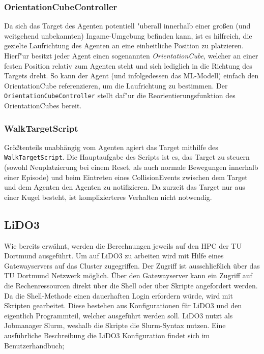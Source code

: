\subsubsection{OrientationCubeController}

Da sich das Target des Agenten potentiell "uberall innerhalb einer großen (und weitgehend unbekannten) Ingame-Umgebung befinden kann, ist es hilfreich, die gezielte Laufrichtung des Agenten an eine einheitliche Position zu platzieren. Hierf"ur besitzt jeder Agent einen sogenannten \textit{OrientationCube}, welcher an einer festen Position relativ zum Agenten steht und sich lediglich in die Richtung des Targets dreht. So kann der Agent (und infolgedessen das ML-Modell) einfach den OrientationCube referenzieren, um die Laufrichtung zu bestimmen. Der \texttt{OrientationCubeController} stellt daf"ur die Reorientierungsfunktion des OrientationCubes bereit.


\subsubsection{WalkTargetScript}

Größtenteils unabhängig vom Agenten agiert das Target mithilfe des \texttt{WalkTargetScript}. Die Hauptaufgabe des Scripts ist es, das Target zu steuern (sowohl Neuplatzierung bei einem Reset, als auch normale Bewegungen innerhalb einer Episode) und beim Eintreten eines CollisionEvents zwischen dem Target und dem Agenten den Agenten zu notifizieren. Da zurzeit das Target nur aus einer Kugel besteht, ist komplizierteres Verhalten nicht notwendig.


\subsection{LiDO3}
Wie bereits erwähnt, werden die Berechnungen jeweils auf den HPC der TU Dortmund ausgeführt. Um auf LiDO3 zu arbeiten wird mit Hilfe eines Gatewayservers auf das Cluster zugegriffen. Der Zugriff ist ausschließlich über das TU Dortmund Netzwerk möglich. Über den Gatewayserver kann ein Zugriff auf die Rechenressourcen direkt über die Shell oder über Skripte angefordert werden. Da die Shell-Methode einen dauerhaften Login erfordern würde, wird mit Skripten gearbeitet. Diese bestehen aus Konfigurationen für LiDO3 und den eigentlich Programmteil, welcher ausgeführt werden soll. LiDO3 nutzt als Jobmanager Slurm, weshalb die Skripte die Slurm-Syntax nutzen. Eine ausführliche Beschreibung die LiDO3 Konfiguration findet sich im Benutzerhandbuch\cite{lido};

